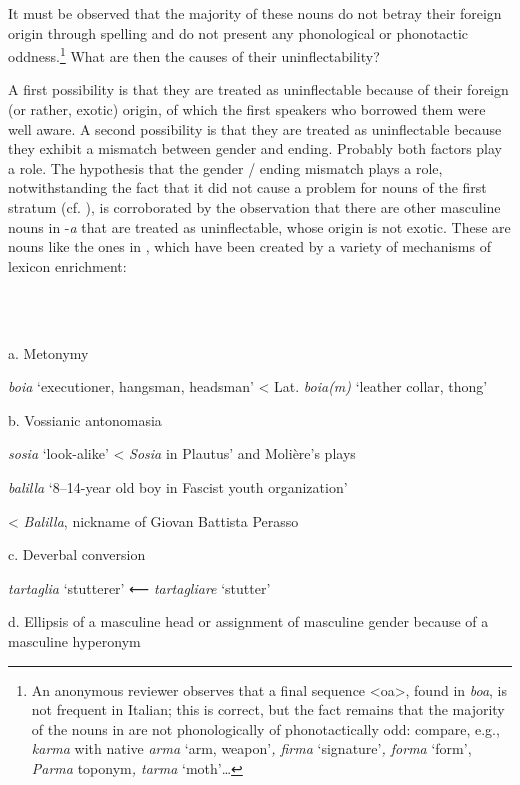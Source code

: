 \documentclass[output=paper]{langscibook}
\begin{document}
It must be observed that the majority of these nouns do not betray their foreign origin through spelling and do not present any phonological or phonotactic oddness.\footnote{An anonymous reviewer observes that a final sequence <oa>, found in \textit{boa}, is not frequent in Italian; this is correct, but the fact remains that the majority of the nouns in  are not phonologically of phonotactically odd: compare, e.g., \textit{karma} with native \textit{arma} ‘arm, weapon’\textit{, firma} ‘signature’\textit{, forma} ‘form’, \textit{Parma}  toponym\textit{, tarma} ‘moth’…} What are then the causes of their uninflectability?

A first possibility is that they are treated as uninflectable because of their foreign (or rather, exotic) origin, of which the first speakers who borrowed them were well aware. A second possibility is that they are treated as uninflectable because they exhibit a mismatch between gender and ending. Probably both factors play a role. The hypothesis that the gender / ending mismatch plays a role, notwithstanding the fact that it did not cause a problem for nouns of the first stratum (cf. ), is corroborated by the observation that there are other masculine nouns in \nobreakdash-\textit{a} that are treated as uninflectable, whose origin is not exotic. These are nouns like the ones in , which have been created by a variety of mechanisms of lexicon enrichment:

\ea%
    \label{ex:key:11}
    \gll \\
         \\
    \glt
    \z %

          a.   Metonymy  

\textit{boia} ‘executioner, hangsman, headsman’ < Lat. \textit{boia(m)} ‘leather collar, thong’

b.  Vossianic antonomasia

\textit{sosia} ‘look-alike’ < \textit{Sosia} in Plautus’ and Molière’s plays

  \textit{balilla} ‘8–14-year old boy in Fascist youth organization’ 

< \textit{Balilla}, nickname of Giovan Battista Perasso

c.  Deverbal conversion 

\textit{tartaglia} ‘stutterer’ ⟵ \textit{tartagliare} ‘stutter’

d.  Ellipsis of a masculine head or assignment of masculine gender because of a masculine hyperonym
\end{document}
